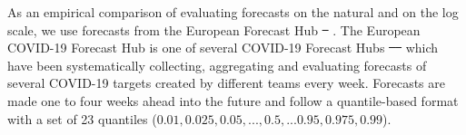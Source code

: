\documentclass[10pt,letterpaper]{article} %
\providecommand{\DIFaddtex}[1]{{\protect\color{blue}\uwave{#1}}} %
\providecommand{\DIFdeltex}[1]{{\protect\color{red}\sout{#1}}}                      %
\providecommand{\DIFaddbegin}{} %
\providecommand{\DIFaddend}{} %
\providecommand{\DIFdelbegin}{} %
\providecommand{\DIFdelend}{} %
\providecommand{\DIFadd}[1]{\texorpdfstring{\DIFaddtex{#1}}{#1}} %
\providecommand{\DIFdel}[1]{\texorpdfstring{\DIFdeltex{#1}}{}} %
\newcommand{\DIFscaledelfig}{0.5}
\newlength{\DIFdelgraphicswidth} %
\newlength{\DIFdelgraphicsheight} %
\newcommand{\DIFaddincludegraphics}[2][]{{\color{blue}\fbox{\DIFOincludegraphics[#1]{#2}}}} %
\newcommand{\DIFdelincludegraphics}[2][]{%
\sbox{\DIFdelgraphicsbox}{\DIFOincludegraphics[#1]{#2}}%
\settoboxwidth{\DIFdelgraphicswidth}{\DIFdelgraphicsbox} %
\settoboxtotalheight{\DIFdelgraphicsheight}{\DIFdelgraphicsbox} %
\scalebox{\DIFscaledelfig}{%
\parbox[b]{\DIFdelgraphicswidth}{\usebox{\DIFdelgraphicsbox}\\[-\baselineskip] \rule{\DIFdelgraphicswidth}{0em}}\llap{\resizebox{\DIFdelgraphicswidth}{\DIFdelgraphicsheight}{%
\setlength{\unitlength}{\DIFdelgraphicswidth}%
\begin{picture}(1,1)%
\thicklines\linethickness{2pt} %
{\color[rgb]{1,0,0}\put(0,0){\framebox(1,1){}}}%
{\color[rgb]{1,0,0}\put(0,0){\line( 1,1){1}}}%
{\color[rgb]{1,0,0}\put(0,1){\line(1,-1){1}}}%
\end{picture}%
}\hspace*{3pt}}} %
} %
\DeclareRobustCommand{\DIFaddbegin}{\DIFOaddbegin \let\includegraphics\DIFaddincludegraphics} %
\DeclareRobustCommand{\DIFaddend}{\DIFOaddend \let\includegraphics\DIFOincludegraphics} %
\DeclareRobustCommand{\DIFdelbegin}{\DIFOdelbegin \let\includegraphics\DIFdelincludegraphics} %
\DeclareRobustCommand{\DIFdelend}{\DIFOaddend \let\includegraphics\DIFOincludegraphics} %
\begin{document}
As an empirical comparison of evaluating forecasts on the natural and on the log scale, we use forecasts from the European Forecast Hub \DIFdelbegin \DIFdel{\mbox{%
\citep{europeancovid-19forecasthubEuropeanCovid19Forecast2021, sherrattPredictivePerformanceMultimodel2022}}\hskip0pt%
}\DIFdelend \DIFaddbegin \DIFadd{\mbox{%
\cite{europeancovid-19forecasthubEuropeanCovid19Forecast2021, sherrattPredictivePerformanceMultimodel2022}}\hskip0pt%
}\DIFaddend . 
The European COVID-19 Forecast Hub is one of several COVID-19 Forecast Hubs \DIFdelbegin \DIFdel{\mbox{%
\citep{cramerEvaluationIndividualEnsemble2021, bracherShorttermForecastingCOVID192021} }\hskip0pt%
}\DIFdelend \DIFaddbegin \DIFadd{\mbox{%
\cite{cramerEvaluationIndividualEnsemble2021, bracherShorttermForecastingCOVID192021} }\hskip0pt%
}\DIFaddend which have been systematically collecting, aggregating and evaluating forecasts of several COVID-19 targets created by different teams every week. Forecasts are made one to four weeks ahead into the future and follow a quantile-based format with a set of 23 quantiles ($0.01, 0.025, 0.05, ..., 0.5, ... 0.95, 0.975, 0.99$). 
\end{document}
